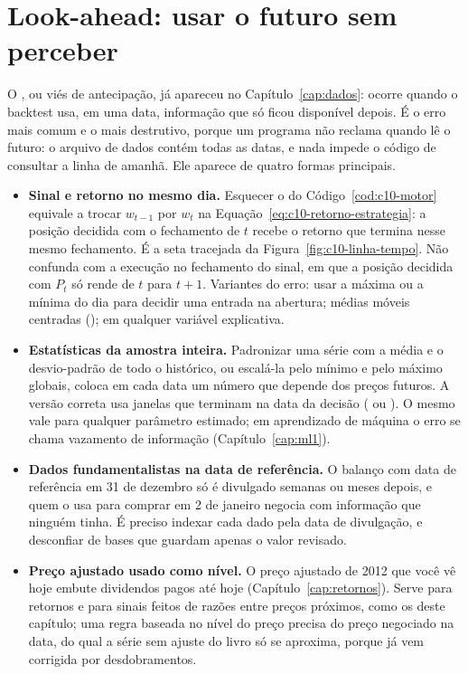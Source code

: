 \section{Look-ahead: usar o futuro sem perceber}
\label{sec:c10-lookahead}

O , ou viés de antecipação, já apareceu no Capítulo~\ref{cap:dados}: ocorre quando o backtest usa, em uma data, informação que só ficou disponível depois. É o erro mais comum e o mais destrutivo, porque um programa não reclama quando lê o futuro: o arquivo de dados contém todas as datas, e nada impede o código de consultar a linha de amanhã. Ele aparece de quatro formas principais.

\begin{itemize}
  \item \textbf{Sinal e retorno no mesmo dia.} Esquecer o  do Código~\ref{cod:c10-motor} equivale a trocar $w_{t-1}$ por $w_t$ na Equação~\eqref{eq:c10-retorno-estrategia}: a posição decidida com o fechamento de $t$ recebe o retorno que termina nesse mesmo fechamento. É a seta tracejada da Figura~\ref{fig:c10-linha-tempo}. Não confunda com a execução no fechamento do sinal, em que a posição decidida com $P_t$ só rende de $t$ para $t+1$. Variantes do erro: usar a máxima ou a mínima do dia para decidir uma entrada na abertura; médias móveis centradas ();  em qualquer variável explicativa.
  \item \textbf{Estatísticas da amostra inteira.} Padronizar uma série com a média e o desvio-padrão de todo o histórico, ou escalá-la pelo mínimo e pelo máximo globais, coloca em cada data um número que depende dos preços futuros. A versão correta usa janelas que terminam na data da decisão ( ou ). O mesmo vale para qualquer parâmetro estimado; em aprendizado de máquina o erro se chama vazamento de informação (Capítulo~\ref{cap:ml1}).
  \item \textbf{Dados fundamentalistas na data de referência.} O balanço com data de referência em 31 de dezembro só é divulgado semanas ou meses depois, e quem o usa para comprar em 2 de janeiro negocia com informação que ninguém tinha. É preciso indexar cada dado pela data de divulgação, e desconfiar de bases que guardam apenas o valor revisado.
  \item \textbf{Preço ajustado usado como nível.} O preço ajustado de 2012 que você vê hoje embute dividendos pagos até hoje (Capítulo~\ref{cap:retornos}). Serve para retornos e para sinais feitos de razões entre preços próximos, como os deste capítulo; uma regra baseada no nível do preço precisa do preço negociado na data, do qual a série sem ajuste do livro só se aproxima, porque já vem corrigida por desdobramentos.
\end{itemize}


